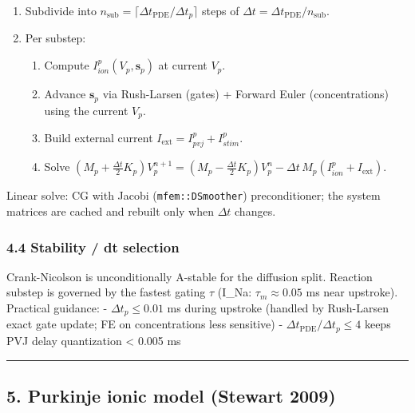 \documentclass[
  11pt,
]{article}
\providecommand{\tightlist}{%
  \setlength{\itemsep}{0pt}\setlength{\parskip}{0pt}}
\begin{document}
\begin{enumerate}
\def\labelenumi{\arabic{enumi}.}
\tightlist
\item
  Subdivide into
  \(n_\mathrm{sub} = \lceil \Delta t_\mathrm{PDE} / \Delta t_p\rceil\)
  steps of \(\Delta t = \Delta t_\mathrm{PDE}/n_\mathrm{sub}\).
\item
  Per substep:

  \begin{enumerate}
  \def\labelenumii{\arabic{enumii}.}
  \tightlist
  \item
    Compute \(I_{ion}^p(V_p, \mathbf{s}_p)\) at current \(V_p\).
  \item
    Advance \(\mathbf{s}_p\) via Rush-Larsen (gates) + Forward Euler
    (concentrations) using the current \(V_p\).
  \item
    Build external current \(I_\mathrm{ext} = I_{pvj}^p + I_{stim}^p\).
  \item
    Solve
    \((M_p + \tfrac{\Delta t}{2} K_p) V_p^{n+1} = (M_p - \tfrac{\Delta t}{2} K_p) V_p^n - \Delta t\, M_p (I_{ion}^p + I_\mathrm{ext})\).
  \end{enumerate}
\end{enumerate}

Linear solve: CG with Jacobi (\texttt{mfem::DSmoother}) preconditioner;
the system matrices are cached and rebuilt only when \(\Delta t\)
changes.

\hypertarget{stability-dt-selection}{%
\subsubsection{4.4 Stability / dt
selection}\label{stability-dt-selection}}

Crank-Nicolson is unconditionally A-stable for the diffusion split.
Reaction substep is governed by the fastest gating \(\tau\) (I\_Na:
\(\tau_m \approx 0.05\) ms near upstroke). Practical guidance: -
\(\Delta t_p \le 0.01\) ms during upstroke (handled by Rush-Larsen exact
gate update; FE on concentrations less sensitive) -
\(\Delta t_\mathrm{PDE}/\Delta t_p \le 4\) keeps PVJ delay quantization
\textless{} 0.005 ms

\begin{center}\rule{0.5\linewidth}{0.5pt}\end{center}

\hypertarget{purkinje-ionic-model-stewart-2009}{%
\subsection{5. Purkinje ionic model (Stewart
2009)}\label{purkinje-ionic-model-stewart-2009}}
\end{document}
